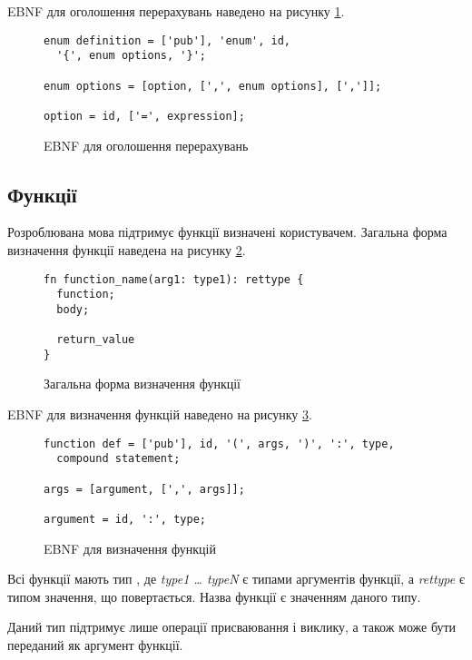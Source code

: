 \documentclass[main.tex]{subfiles}
\begin{document}
EBNF для оголошення перерахувань наведено на рисунку \ref{ebnf:enum}.

\begin{figure}[h]
  \centering
  \begin{verbatim}
enum definition = ['pub'], 'enum', id,
  '{', enum options, '}';

enum options = [option, [',', enum options], [',']];

option = id, ['=', expression];
  \end{verbatim}
  \caption{EBNF для оголошення перерахувань}
  \label{ebnf:enum}
\end{figure}

\FloatBarrier
\subsection{Функції}
Розроблювана мова підтримує функції визначені користувачем. Загальна форма визначення функції наведена на рисунку \ref{lang:function:definition}.

\begin{figure}[h]
  \centering
  \begin{verbatim}
fn function_name(arg1: type1): rettype {
  function;
  body;

  return_value
}
  \end{verbatim}
  \caption{Загальна форма визначення функції}
  \label{lang:function:definition}
\end{figure}

EBNF для визначення функцій наведено на рисунку \ref{ebnf:function}.

\begin{figure}[h]
  \centering
  \begin{verbatim}
function def = ['pub'], id, '(', args, ')', ':', type,
  compound statement;

args = [argument, [',', args]];

argument = id, ':', type;
  \end{verbatim}
  \caption{EBNF для визначення функцій}
  \label{ebnf:function}
\end{figure}

Всі функції мають тип , де \emph{type1 \ldots{} typeN} є типами аргументів функції, а \emph{rettype} є типом значення, що повертається.
Назва функції є значенням даного типу.

Даний тип підтримує лише операції присваювання і виклику, а також може бути переданий як аргумент функції.
\end{document}

